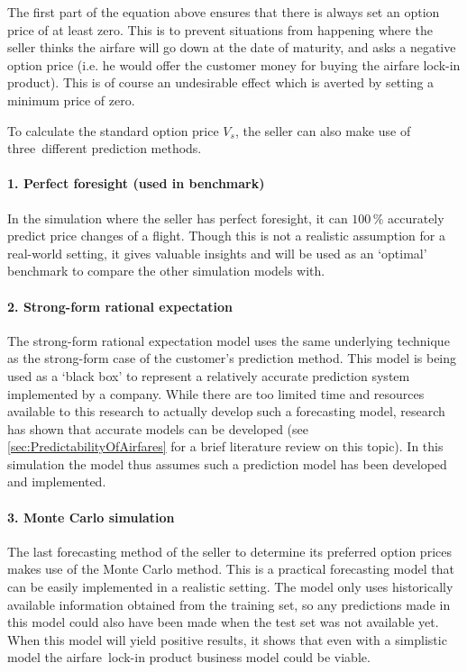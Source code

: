 The first part of the equation above ensures that there is always set an option price of at least zero. This is to prevent situations from happening where the seller thinks the airfare will go down at the date of maturity, and asks a negative option price (i.e. he would offer the customer money for buying the airfare lock-in product). This is of course an undesirable effect which is averted by setting a minimum price of zero.


To calculate the standard option price $V_s$, the seller can also make use of three~different prediction methods.

\paragraph{1. Perfect foresight (used in benchmark)}
In the simulation where the seller has perfect foresight, it can $100\,\%$ accurately predict price changes of a flight. Though this is not a realistic assumption for a real-world setting, it gives valuable insights and will be used as an `optimal' benchmark to compare the other simulation models with.

\paragraph{2. Strong-form rational expectation}
The strong-form rational expectation model uses the same underlying technique as the strong-form case of the customer's prediction method. This model is being used as a `black box' to represent a relatively accurate prediction system implemented by a company. While there are too limited time and resources available to this research to actually develop such a forecasting model, research has shown that accurate models can be developed (see \autoref{sec:PredictabilityOfAirfares} for a brief literature review on this topic). In this simulation the model thus assumes such a prediction model has been developed and implemented.

\paragraph{3. Monte Carlo simulation}
The last forecasting method of the seller to determine its preferred option prices makes use of the Monte Carlo method. This is a practical forecasting model that can be easily implemented in a realistic setting. The model only uses historically available information obtained from the training set, so any predictions made in this model could also have been made when the test set was not available yet. When this model will yield positive results, it shows that even with a simplistic model the airfare~lock-in product business model could be viable.



